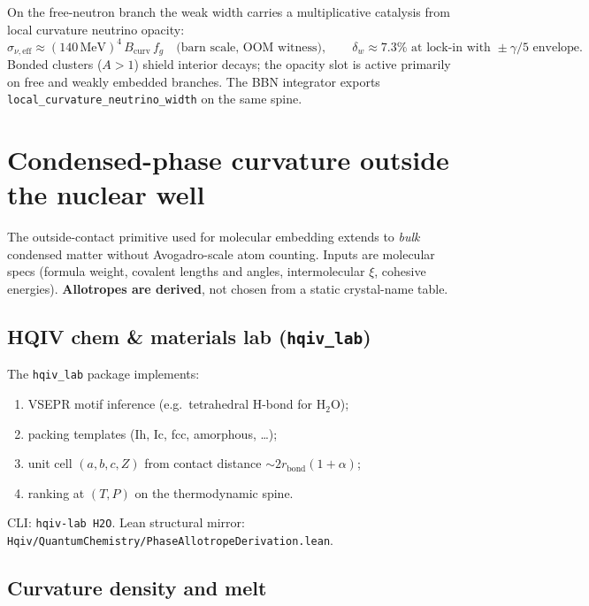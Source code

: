 \documentclass[11pt,a4paper]{article}
\theoremstyle{plain}
\theoremstyle{definition}
\theoremstyle{remark}
\theoremstyle{plain}
\theoremstyle{definition}
\begin{document}
On the free-neutron branch the weak width carries a multiplicative catalysis from local curvature neutrino opacity:
\[
  \sigma_{\nu,\mathrm{eff}} \approx (140\,\mathrm{MeV})^4\, B_{\mathrm{curv}}\, f_g \quad\text{(barn scale, OOM witness)},
  \qquad
  \delta_w \approx 7.3\% \text{ at lock-in with } \pm\gamma/5 \text{ envelope}.
\]
Bonded clusters ($A>1$) shield interior decays; the opacity slot is active primarily on free and weakly embedded branches.
The BBN integrator exports \texttt{local\_curvature\_neutrino\_width} on the same spine.

\section{Condensed-phase curvature outside the nuclear well}
\label{sec:phase-outside}

The outside-contact primitive used for molecular embedding extends to \emph{bulk} condensed matter without Avogadro-scale atom counting.
Inputs are molecular specs (formula weight, covalent lengths and angles, intermolecular $\xi$, cohesive energies).
\textbf{Allotropes are derived}, not chosen from a static crystal-name table.

\subsection{HQIV chem \& materials lab (\texttt{hqiv\_lab})}

The \texttt{hqiv\_lab} package implements:
\begin{enumerate}[leftmargin=2em]
\item VSEPR motif inference (e.g.\ tetrahedral H-bond for $\mathrm{H_2O}$);
\item packing templates (Ih, Ic, fcc, amorphous, \ldots);
\item unit cell $(a,b,c,Z)$ from contact distance $\sim 2 r_{\mathrm{bond}}(1+\alpha)$;
\item ranking at $(T,P)$ on the thermodynamic spine.
\end{enumerate}
CLI: \texttt{hqiv-lab H2O}. Lean structural mirror:
\texttt{Hqiv/QuantumChemistry/PhaseAllotropeDerivation.lean}.

\subsection{Curvature density and melt}
\end{document}
